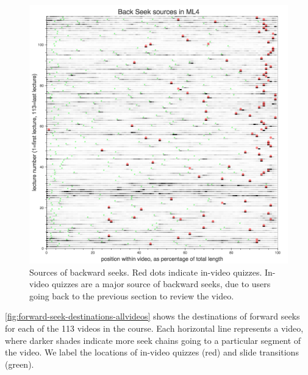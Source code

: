 \documentclass{sigchi}
\begin{document}
\begin{figure}
\includegraphics[width=1.0\columnwidth]{back-seek-sources-allvideos}
\caption{Sources of backward seeks. Red dots indicate in-video quizzes. In-video quizzes are a major source of backward seeks, due to users going back to the previous section to review the video.}
\label{fig:back-seek-sources-allvideos}
\end{figure}

\autoref{fig:forward-seek-destinations-allvideos} shows the destinations of forward seeks for each of the 113 videos in the course. Each horizontal line represents a video, where darker shades indicate more seek chains going to a particular segment of the video. We label the locations of in-video quizzes (red) and slide transitions (green). %

\end{document}
